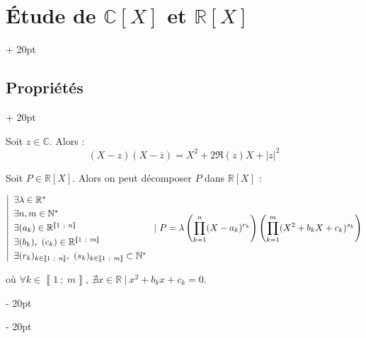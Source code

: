 \documentclass[a4paper, 12pt, twoside]{article}
\newcommand{\N}{\mathbb{N}} %
\newcommand{\R}{\mathbb{R}} %
\newcommand{\C}{\mathbb{C}} %
\newcommand{\nset}[2]{\left\llbracket #1\ ;\ #2 \right\rrbracket}
\newcommand{\cj}[1]{\overline{#1}} %
\newcommand{\abs}[1]{\left\lvert #1 \right\rvert} %
\newcommand{\lr}[1]{\left( #1 \right)}
\newcommand{\ind}[1][20pt]{\advance\leftskip + #1}
\newcommand{\deind}[1][20pt]{\advance\leftskip - #1}
\newenvironment{indt}[2][20pt]{#2 \par \ind[#1]}{\par \deind} %
\begin{document}
\begin{indt}{\section{\'Etude de $\C[X]$ et $\R[X]$}}
\begin{indt}{\subsection{Propriétés}}
            \vspace{6pt}
            
            Soit $z \in \C$. Alors :
                \[ (X - z)(X - \cj z) = X^2 + 2\Re(z)X + \abs{z}^2 \]
            
            \vspace{6pt}
            
            Soit $P \in \R[X]$. Alors on peut décomposer $P$ dans $\R[X]$ :
                
                $
                    \displaystyle
                    \left|
                    \begin{array}{l}
                        \exists \lambda \in \R^*
                        \vspace{3pt}
                        \\
                        \exists n, m \in \N^*
                        \vspace{3pt}
                        \\
                        \exists (a_k) \in \R^{\nset 1 n}
                        \vspace{3pt}
                        \\
                        \exists (b_k),\ (c_k) \in \R^{\nset 1 m}
                        \vspace{3pt}
                        \\
                        \exists (r_k)_{k \in \nset 1 n},\ (s_k)_{k \in \nset 1 m} \subset \N^*
                    \end{array}
                    \right.
                    |\ P = \lambda \lr{\prod_{k = 1}^n (X - a_k)^{r_k}} \lr{\prod_{k = 1}^m (X^2 + b_k X + c_k)^{s_k}}
                $
                
                \vspace{6pt}
                
                où $\forall k \in \nset 1 m,\ \nexists x \in \R\ |\ x^2 + b_k x + c_k = 0$.
        \end{indt}
        
    \end{indt}





    
    
    
\end{document}
